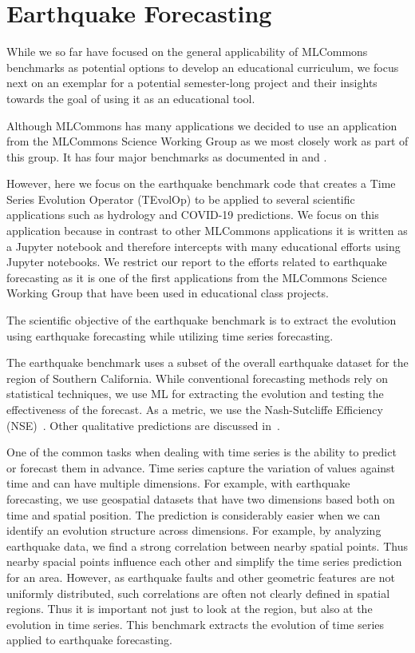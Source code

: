 \documentclass[utf8]{FrontiersinVancouver} %
\begin{document}
\section{Earthquake Forecasting}
\label{sec:eq}

While we so far have focused on the general applicability of MLCommons benchmarks as potential options to develop an educational curriculum, we focus next on an exemplar for a potential semester-long project and their insights towards the goal of using it as an educational tool.

Although MLCommons has many applications we decided to use an application from the MLCommons Science Working Group as we most closely work as part of this group. It has four major benchmarks as documented in \cite{las-22-mlcommons-science} and \cite{las-2023-escience}. 

However, here we focus on the earthquake benchmark code that creates a Time  Series Evolution Operator (TEvolOp) to be applied to several scientific applications such as hydrology and COVID-19 predictions. We focus on this application because in contrast to other MLCommons applications it is written as a Jupyter notebook and therefore intercepts with many educational efforts using Jupyter notebooks. We restrict our report to the efforts related to earthquake forecasting as it is one of the first applications from the MLCommons Science Working Group that have been used in educational class projects. 

The scientific objective of the earthquake benchmark is to extract the evolution using earthquake forecasting while utilizing time series forecasting.

The earthquake benchmark uses a subset of the overall earthquake dataset for the region of Southern California. While conventional forecasting methods rely on statistical techniques, we use ML for extracting the evolution and testing the effectiveness of the forecast. As a metric, we use the Nash-Sutcliffe Efficiency (NSE)~\citep{nash-79}. Other qualitative predictions are discussed in~\citep{fox2022-jm}.

One of the common tasks when dealing with time series is the ability to predict or forecast them in advance. Time series capture the variation of values against time and can have multiple dimensions. For example, with earthquake forecasting, we use geospatial datasets that have two dimensions based both on time and spatial position. The prediction is considerably easier when we can identify an evolution structure across dimensions. For example, by analyzing earthquake data, we find a strong correlation between nearby spatial points. Thus nearby spacial points influence each other and simplify the time series prediction for an area. However, as earthquake faults and other geometric features are not uniformly distributed, such correlations are often not clearly defined in spatial regions. Thus it is important not just to look at the region, but also at the evolution in time series. This benchmark extracts the evolution of time series applied to earthquake forecasting.
\end{document}
